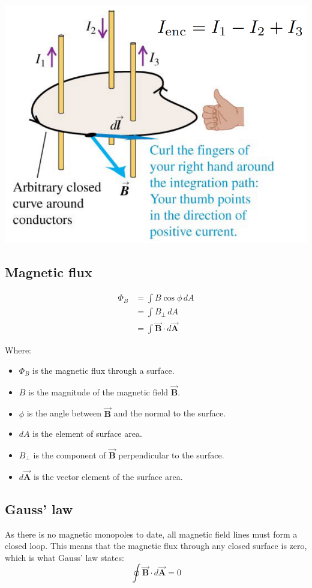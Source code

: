 \documentclass[11pt]{article}
\begin{document}
\begin{center}
\includegraphics[scale=0.65]{./images/amperes-law.png}
\end{center}
\subsection{Magnetic flux}
\label{sec:org9c610fc}
\begin{align*}
\Phi_B &= \int B \cos \phi \, dA \\
&= \int B_{\perp} \, dA \\
&= \int \vec{\boldsymbol{B}} \cdot d \vec{\boldsymbol{A}}
\end{align*}

Where:
\begin{itemize}
\item \(\Phi_B\) is the magnetic flux through a surface.
\item \(B\) is the magnitude of the magnetic field \(\vec{\boldsymbol{B}}\).
\item \(\phi\) is the angle between \(\vec{\boldsymbol{B}}\) and the normal to the surface.
\item \(dA\) is the element of surface area.
\item \(B_{\perp}\) is the component of \(\vec{\boldsymbol{B}}\) perpendicular to the surface.
\item \(d \vec{\boldsymbol{A}}\) is the vector element of the surface area.
\end{itemize}
\subsection{Gauss' law}
\label{sec:orgc2a9773}
As there is no magnetic monopoles to date, all magnetic field lines must form a closed loop. This means that the magnetic flux through any closed surface is zero, which is what Gauss' law states:
\[\oint \vec{\boldsymbol{B}} \cdot d \vec{\boldsymbol{A}} = 0\]
\end{document}
